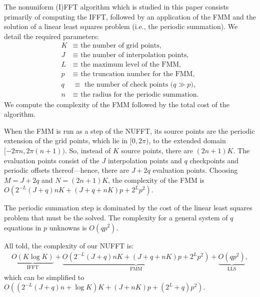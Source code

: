 The nonuniform (I)FFT algorithm which is studied in this paper
consists primarily of computing the IFFT, followed by an application
of the FMM and the solution of a linear least squares problem (i.e.,
the periodic summation). We detail the required parameters:
\begin{align*}
  K &\equiv \mbox{ the number of grid points,} \\
  J &\equiv \mbox{ the number of interpolation points,} \\
  L &\equiv \mbox{ the maximum level of the FMM,} \\
  p &\equiv \mbox{ the truncation number for the FMM,} \\
  q &\equiv \mbox{ the number of check points ($q \gg p$),} \\
  n &\equiv \mbox{ the radius for the periodic summation.}
\end{align*}
We compute the complexity of the FMM followed by the total cost of the
algorithm.

When the FMM is run as a step of the NUFFT, its source points are the
periodic extension of the grid points, which lie in $[0, 2\pi)$, to
the extended domain $[-2\pi n, 2 \pi (n + 1))$. So, instead of $K$
source points, there are $(2n + 1)K$. The evaluation points consist of
the $J$ interpolation points and $q$ checkpoints and periodic offsets
thereof\----hence, there are $J + 2q$ evaluation points. Choosing
$M = J + 2q$ and $N = (2n + 1)K$, the complexity of the FMM is
$O(2^{-L}(J+q)nK + (J + q + nK)p + 2^Lp^2)$.

The periodic summation step is dominated by the cost of the linear
least squares problem that must be the solved. The complexity for a
general system of $q$ equations in $p$ unknowns is $O(qp^2)$.

All told, the complexity of our NUFFT is:
\begin{align*}
  \underbrace{O(K \log K)}_{\text{IFFT}} + \underbrace{O(2^{-L}(J+q)nK + (J + q + nK)p + 2^Lp^2)}_{\text{FMM}} + \underbrace{O(qp^2)}_{\text{LLS}},
\end{align*}
which can be simplified to $O((2^{-L}(J+q)n + \log K)K + (J + nK)p + (2^L + q)p^2)$.

